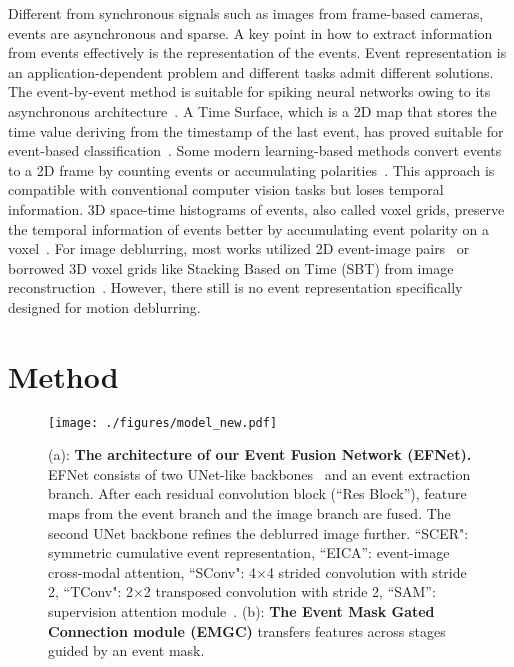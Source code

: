 \documentclass[runningheads]{llncs}
\newcommand{\PAR}[1]{\noindent{\bf #1}}
\newlength \g
\begin{document}
\PAR{Event representation.} Different from synchronous signals such as images from frame-based cameras, events are asynchronous and sparse. A key point in how to extract information from events effectively is the representation of the events. Event representation is an application-dependent problem and different tasks admit different solutions. The event-by-event method is suitable for spiking neural networks owing to its asynchronous architecture~\cite{snnref2,snnref3,snnref1}. A Time Surface, which is a 2D map that stores the time value deriving from the timestamp of the last event, has proved suitable for event-based classification~\cite{ahad2012motion,lagorce2016hots,sironi2018hats}.
Some modern learning-based methods convert events to a 2D frame by counting events or accumulating polarities~\cite{liu2018adaptive,maqueda2018event,shang2021bringing}. This approach is compatible with conventional computer vision tasks but loses temporal information. 3D space-time histograms of events, also called voxel grids, preserve the temporal information of events better by accumulating event polarity on a voxel~\cite{bardow2016simultaneous,zhu2019evflownet}. For image deblurring, most works utilized 2D event-image pairs~\cite{shang2021bringing} or borrowed 3D voxel grids like Stacking Based on Time (SBT) from image reconstruction~\cite{wang2019event}. However, there still is no event representation specifically designed for motion deblurring.


\section{Method}
\label{sec:method}

\begin{figure*}[tb]
\centering 
    \texttt{[image: ./figures/model\_new.pdf]}
    \vspace{-5mm}
    \caption{(a): \textbf{The architecture of our Event Fusion Network (EFNet).} EFNet consists of two UNet-like backbones~\cite{ronneberger2015u} and an event extraction branch. After each residual convolution block (``Res Block''), feature maps from the event branch and the image branch are fused. The second UNet backbone refines the deblurred image further. ``SCER": symmetric cumulative event representation, ``EICA'': event-image cross-modal attention, ``SConv": 4$\times$4 strided convolution with stride 2, ``TConv": 2$\times$2 transposed convolution with stride 2, ``SAM'': supervision attention module~\cite{zamir2021multi}. (b): \textbf{The Event Mask Gated Connection module (EMGC)} transfers features across stages guided by an event mask.}
    \vspace{-5mm}
    \label{fig:model}
\end{figure*}
\end{document}
